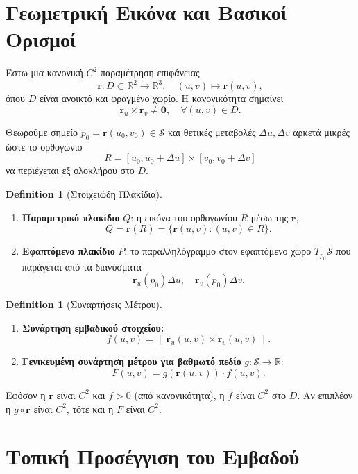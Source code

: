 \documentclass[10pt,a4paper,twoside,openany]{book}
\theoremstyle{plain}
\theoremstyle{definition}
\newtheorem{definition}[theorem]{Definition}
\theoremstyle{remark}
\numberwithin{equation}{section}
\begin{document}
\section{Γεωμετρική Εικόνα και Βασικοί Ορισμοί}

Έστω μια κανονική \(C^2\)-παραμέτρηση επιφάνειας
\[
\mathbf{r} : D \subset \mathbb{R}^2 \to \mathbb{R}^3, \quad (u,v) \mapsto \mathbf{r}(u,v),
\]
όπου \(D\) είναι ανοικτό και φραγμένο χωρίο. Η κανονικότητα σημαίνει
\[
\mathbf{r}_u \times \mathbf{r}_v \neq \mathbf{0}, \quad \forall (u,v) \in D.
\]

Θεωρούμε σημείο \(p_0 = \mathbf{r}(u_0, v_0) \in \mathcal{S}\) και θετικές μεταβολές \(\Delta u, \Delta v\) αρκετά μικρές ώστε το ορθογώνιο
\[
R = [u_0, u_0+\Delta u] \times [v_0, v_0+\Delta v]
\]
να περιέχεται εξ ολοκλήρου στο \(D\).

\begin{definition}[Στοιχειώδη Πλακίδια]
\begin{enumerate}
\item \textbf{Παραμετρικό πλακίδιο} \(Q\): η εικόνα του ορθογωνίου \(R\) μέσω της \(\mathbf{r}\),
\[
Q = \mathbf{r}(R) = \{ \mathbf{r}(u,v) : (u,v) \in R \}.
\]
\item \textbf{Εφαπτόμενο πλακίδιο} \(P\): το παραλληλόγραμμο στον εφαπτόμενο χώρο \(T_{p_0}\mathcal{S}\) που παράγεται από τα διανύσματα
\[
\mathbf{r}_u(p_0)\Delta u, \quad \mathbf{r}_v(p_0)\Delta v.
\]
\end{enumerate}
\end{definition}

\begin{definition}[Συναρτήσεις Μέτρου]
\begin{enumerate}
\item \textbf{Συνάρτηση εμβαδικού στοιχείου:}
\[
f(u,v) = \| \mathbf{r}_u(u,v) \times \mathbf{r}_v(u,v) \|.
\]
\item \textbf{Γενικευμένη συνάρτηση μέτρου για βαθμωτό πεδίο} \(g: \mathcal{S} \to \mathbb{R}\):
\[
F(u,v) = g(\mathbf{r}(u,v)) \cdot f(u,v).
\]
\end{enumerate}
\end{definition}

Εφόσον η \(\mathbf{r}\) είναι \(C^2\) και \(f > 0\) (από κανονικότητα), η \(f\) είναι \(C^2\) στο \(D\). Αν επιπλέον η \(g \circ \mathbf{r}\) είναι \(C^2\), τότε και η \(F\) είναι \(C^2\).

\section{Τοπική Προσέγγιση του Εμβαδού}
\end{document}
